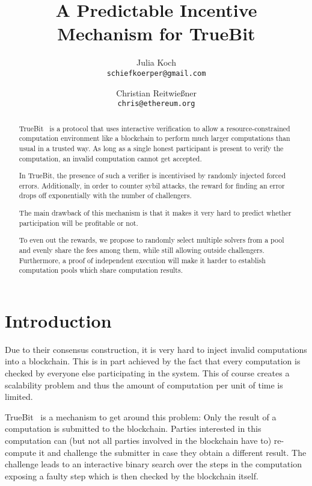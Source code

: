 \documentclass[a4paper]{article}
\title{A Predictable Incentive Mechanism for TrueBit}
\author{Julia Koch\\ \texttt{schiefkoerper@gmail.com}
\and
Christian Reitwießner\\ \texttt{chris@ethereum.org}}
\begin{document}
\maketitle

\begin{abstract}
\noindent
TrueBit~\cite{truebit} is a protocol that uses interactive verification to allow a resource-constrained
computation environment like a blockchain to perform much larger computations than usual
in a trusted way. As long as a single honest participant is present to verify the computation,
an invalid computation cannot get accepted.

\noindent
In TrueBit, the presence of such a verifier is incentivised by randomly injected forced errors.
Additionally, in order to counter sybil attacks, the reward for finding an error drops off exponentially
with the number of challengers.

\noindent
The main drawback of this mechanism is that it makes it very hard to predict whether participation will be
profitable or not.

\noindent
To even out the rewards, we propose to randomly select multiple solvers from a pool and
evenly share the fees among them, while still allowing outside challengers.
Furthermore, a proof of independent execution will make it harder to establish computation
pools which share computation results.
\end{abstract}

\section{Introduction}

Due to their consensus construction, it is very hard to inject invalid computations
into a blockchain. This is in part achieved by the fact that every computation is checked
by everyone else participating in the system. This of course creates a scalability problem
and thus the amount of computation per unit of time is limited.

TrueBit~\cite{truebit} is a mechanism to get around this problem: Only the result of
a computation is submitted to the blockchain. Parties interested in this computation can
(but not all parties involved in the blockchain have to) re-compute it and challenge the submitter in case
they obtain a different result.
The challenge leads to an interactive binary search over the steps in the computation
exposing a faulty step which is then checked by the blockchain itself.
\end{document}
